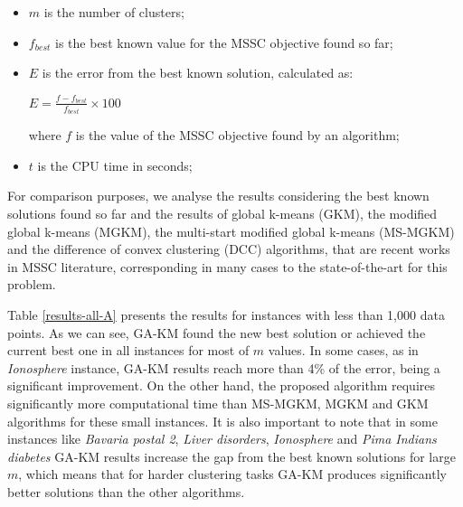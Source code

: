 \begin{itemize}

	\item $m$ is the number of clusters;

	\item $f_{best}$ is the best known value for the MSSC objective found so far;

	\item $E$ is the error from the best known solution, calculated as:

		\begin{center}
		\large
			$E = \frac{f - f_{best}}{f_{best}} \times 100$
		\end{center}
		
	where $f$ is the value of the MSSC objective found by an algorithm;
	
	\item $t$ is the CPU time in seconds;


\end{itemize}

For comparison purposes, we analyse the results considering the best known solutions found so far and the results of global k-means (GKM), the modified global k-means (MGKM), the multi-start modified global k-means (MS-MGKM) and the difference of convex clustering (DCC) algorithms, that are recent works in MSSC literature, corresponding in many cases to the state-of-the-art for this problem.







Table \ref{results-all-A} presents the results for instances with less than 1,000 data points. As we can see, GA-KM found the new best solution or achieved the current best one in all instances for most of $m$ values. In some cases, as in \textit{Ionosphere} instance, GA-KM results reach more than 4\% of the error, being a significant improvement. On the other hand, the proposed algorithm requires significantly more computational time than MS-MGKM, MGKM and GKM algorithms for these small instances. It is also important to note that in some instances like \textit{Bavaria postal 2}, \textit{Liver disorders}, \textit{Ionosphere} and \textit{Pima Indians diabetes} GA-KM results increase the gap from the best known solutions for large $m$, which means that for harder clustering tasks GA-KM produces significantly better solutions than the other algorithms.

